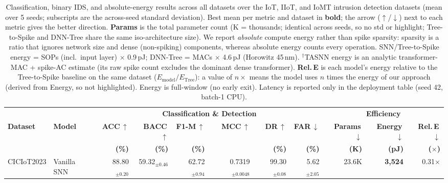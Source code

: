 \begin{table}[!ht]
\centering
\renewcommand{\arraystretch}{1.1}
\caption{Classification, binary IDS, and absolute-energy results across all datasets over the IoT, IIoT, and IoMT intrusion detection datasets (mean over 5 seeds; subscripts are the across-seed standard deviation). Best mean per metric and dataset in \colorbox{bestcell}{\textbf{bold}}; the arrow ($\uparrow$/$\downarrow$) next to each metric gives the better direction. \textbf{Params} is the total parameter count (K = thousands; identical across seeds, so no std or highlight; Tree-to-Spike and DNN-Tree share the same iso-architecture size). We report \emph{absolute} compute energy rather than spike sparsity: sparsity is a ratio that ignores network size and dense (non-spiking) components, whereas absolute energy counts every operation. SNN/Tree-to-Spike energy = SOPs (incl.\ input layer) $\times$ 0.9\,pJ; DNN-Tree = MACs $\times$ 4.6\,pJ (Horowitz 45\,nm). $^\dagger$TASNN energy is an analytic transformer-MAC + spike-AC estimate (its raw spike count excludes the dominant dense transformer). \textbf{Rel.\,E} is each model's energy relative to the Tree-to-Spike baseline on the same dataset ($E_{\mathrm{model}}/E_{\mathrm{Tree}}$): a value of $n\times$ means the model uses $n$ times the energy of our approach (derived from Energy, so not highlighted). Energy is full-window (no early exit). Latency is reported only in the deployment table (seed 42, batch-1 CPU).}
\label{tab:results_iot}
{\scriptsize
\begin{tabular}{l l r r r r r r r r r}
\toprule
& & \multicolumn{6}{c}{\textbf{Classification \& Detection}} & \multicolumn{3}{c}{\textbf{Efficiency}} \\
\cmidrule(lr){3-8} \cmidrule(lr){9-11}
\textbf{Dataset} & \textbf{Model} & \textbf{ACC}\,$\uparrow$ & \textbf{BACC}\,$\uparrow$ & \textbf{F1-M}\,$\uparrow$ & \textbf{MCC}\,$\uparrow$ & \textbf{DR}\,$\uparrow$ & \textbf{FAR}\,$\downarrow$ & \textbf{Params}\,$\downarrow$ & \textbf{Energy}\,$\downarrow$ & \textbf{Rel.\,E}\,$\downarrow$ \\
& & \textbf{(\%)} & \textbf{(\%)} & \textbf{(\%)} & & \textbf{(\%)} & \textbf{(\%)} & \textbf{(K)} & \textbf{(pJ)} & \textbf{($\times$)} \\
\midrule
\multirow{4}{*}{CICIoT2023}
& Vanilla SNN   & 88.80$_{\pm0.20}$ & 59.32$_{\pm0.46}$ & 62.72$_{\pm0.94}$ & 0.7319$_{\pm0.0048}$ & 99.30$_{\pm0.08}$ & 5.62$_{\pm2.05}$ & 23.6K & \cellcolor{bestcell}\textbf{3,524} & 0.31$\times$ \\

\end{tabular}}
\end{table}
